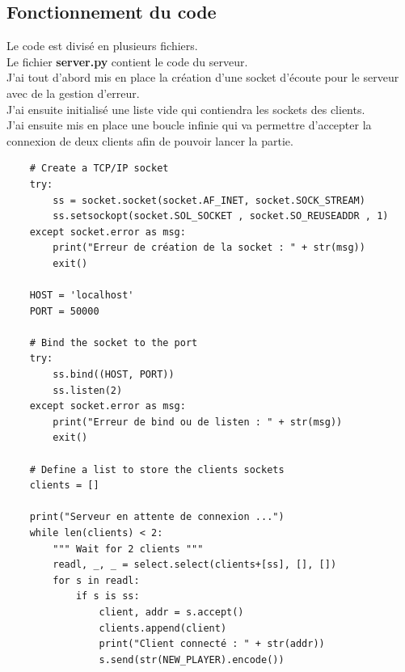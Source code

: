 \documentclass{article}
\begin{document}
\subsection{Fonctionnement du code}
Le code est divisé en plusieurs fichiers.\\
Le fichier \textbf{server.py} contient le code du serveur.\\
J'ai tout d'abord mis en place la création d'une socket d'écoute pour le serveur avec de la gestion d'erreur.\\
J'ai ensuite initialisé une liste vide qui contiendra les sockets des clients.\\
J'ai ensuite mis en place une boucle infinie qui va permettre d'accepter la connexion de deux clients afin de pouvoir lancer la partie.\\
\begin{lstlisting}
    # Create a TCP/IP socket
    try:
        ss = socket.socket(socket.AF_INET, socket.SOCK_STREAM)
        ss.setsockopt(socket.SOL_SOCKET , socket.SO_REUSEADDR , 1)
    except socket.error as msg:
        print("Erreur de création de la socket : " + str(msg))
        exit()
    
    HOST = 'localhost'
    PORT = 50000
    
    # Bind the socket to the port
    try:
        ss.bind((HOST, PORT))
        ss.listen(2)
    except socket.error as msg:
        print("Erreur de bind ou de listen : " + str(msg))
        exit()
    
    # Define a list to store the clients sockets
    clients = []
    
    print("Serveur en attente de connexion ...")
    while len(clients) < 2:
        """ Wait for 2 clients """
        readl, _, _ = select.select(clients+[ss], [], [])
        for s in readl:
            if s is ss:
                client, addr = s.accept()
                clients.append(client)
                print("Client connecté : " + str(addr))
                s.send(str(NEW_PLAYER).encode())
\end{lstlisting}
\end{document}
